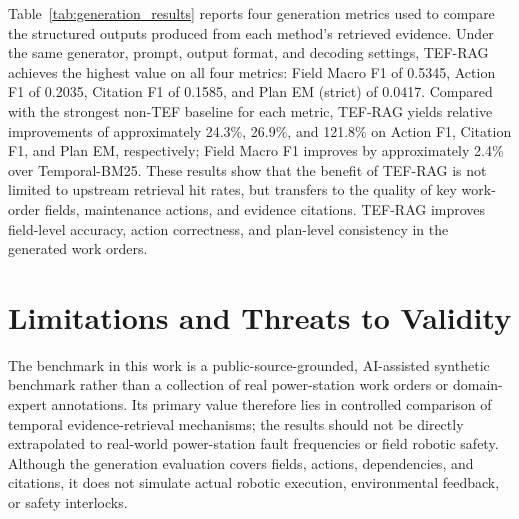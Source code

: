 Table~\ref{tab:generation_results} reports four generation metrics used to compare the structured outputs produced from each method's retrieved evidence.
Under the same generator, prompt, output format, and decoding settings, TEF-RAG achieves the highest value on all four metrics:
Field Macro F1 of 0.5345, Action F1 of 0.2035, Citation F1 of 0.1585, and Plan EM (strict) of 0.0417.
Compared with the strongest non-TEF baseline for each metric, TEF-RAG yields relative improvements of approximately 24.3\%, 26.9\%, and 121.8\% on Action F1, Citation F1, and Plan EM, respectively; Field Macro F1 improves by approximately 2.4\% over Temporal-BM25.
These results show that the benefit of TEF-RAG is not limited to upstream retrieval hit rates, but transfers to the quality of key work-order fields, maintenance actions, and evidence citations.
TEF-RAG improves field-level accuracy, action correctness, and plan-level consistency in the generated work orders.

\begin{table}[t]
\caption{Primary structured-generation metrics on the generation test set.}
\label{tab:generation_results}
\centering
\small
\setlength{\tabcolsep}{3pt}
\end{table}

\section{Limitations and Threats to Validity}
\label{sec:limitations}

The benchmark in this work is a public-source-grounded, AI-assisted synthetic benchmark rather than a collection of real power-station work orders or domain-expert annotations.
Its primary value therefore lies in controlled comparison of temporal evidence-retrieval mechanisms; the results should not be directly extrapolated to real-world power-station fault frequencies or field robotic safety.
Although the generation evaluation covers fields, actions, dependencies, and citations, it does not simulate actual robotic execution, environmental feedback, or safety interlocks.


